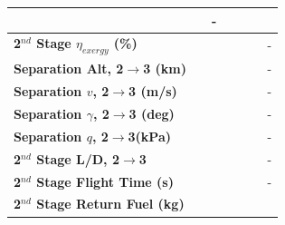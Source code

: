 \begin{table}[ht]
\begin{tabular}{l c c c c c c}
		& \firstsecondSeparationgammaISPThreeOneHundredTen
		& -
		\\
		\hline 
		\textbf{2$^{nd}$ Stage $\eta_{exergy}$ (\%)}
		& \textbf{\secondExergyEffISPThreeNinety}
		& \textbf{\secondExergyEffISPThreeNinetyFive}
		& \textbf{\secondExergyEffISPThreeStandard}
		& \textbf{\secondExergyEffISPThreeOneHundredFive}
		& \textbf{\secondExergyEffISPThreeOneHundredTen}
		& -
		\\
		\textbf{Separation Alt, 2$\rightarrow$3 (km)}
		& \secondthirdSeparationAltISPThreeNinety
		& \secondthirdSeparationAltISPThreeNinetyFive
		& \secondthirdSeparationAltISPThreeStandard
		& \secondthirdSeparationAltISPThreeOneHundredFive
		& \secondthirdSeparationAltISPThreeOneHundredTen
		& -
		\\
		\textbf{Separation $v$, 2$\rightarrow$3 (m/s)}
		& \secondthirdSeparationvISPThreeNinety
		& \secondthirdSeparationvISPThreeNinetyFive
		& \secondthirdSeparationvISPThreeStandard
		& \secondthirdSeparationvISPThreeOneHundredFive
		& \secondthirdSeparationvISPThreeOneHundredTen
		& -
		\\
		\textbf{Separation $\gamma$, 2$\rightarrow$3 (deg)}
		& \secondthirdSeparationgammaISPThreeNinety
		& \secondthirdSeparationgammaISPThreeNinetyFive
		& \secondthirdSeparationgammaISPThreeStandard
		& \secondthirdSeparationgammaISPThreeOneHundredFive
		& \secondthirdSeparationgammaISPThreeOneHundredTen
		& -
		\\
		\textbf{Separation $q$, 2$\rightarrow$3(kPa)}
		& \secondthirdSeparationqISPThreeNinety
		& \secondthirdSeparationqISPThreeNinetyFive
		& \secondthirdSeparationqISPThreeStandard
		& \secondthirdSeparationqISPThreeOneHundredFive
		& \secondthirdSeparationqISPThreeOneHundredTen
		& -
		\\
		\textbf{2$^{nd}$ Stage L/D, 2$\rightarrow$3}
		& \secondthirdSeparationLDISPThreeNinety
		& \secondthirdSeparationLDISPThreeNinetyFive
		& \secondthirdSeparationLDISPThreeStandard
		& \secondthirdSeparationLDISPThreeOneHundredFive
		& \secondthirdSeparationLDISPThreeOneHundredTen
		& -
		\\
		\textbf{2$^{nd}$ Stage Flight Time (s)}
		& \secondFlightTimeISPThreeNinety
		& \secondFlightTimeISPThreeNinetyFive
		& \secondFlightTimeISPThreeStandard
		& \secondFlightTimeISPThreeOneHundredFive
		& \secondFlightTimeISPThreeOneHundredTen
		& -
		\\
		\textbf{2$^{nd}$ Stage Return Fuel (kg)}
		& \returnFuelISPThreeNinety
		& \returnFuelISPThreeNinetyFive
		& \returnFuelISPThreeStandard
		& \returnFuelISPThreeOneHundredFive

\end{tabular}
\end{table}
